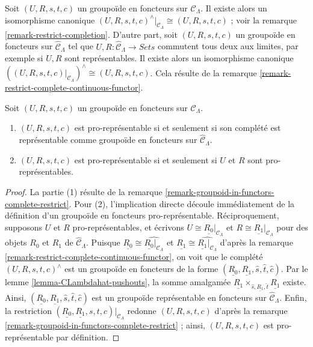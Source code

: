 \begin{remark}
\label{remark-groupoid-in-functors-complete-restrict}
Soit $(U, R, s, t, c)$ un groupoïde en foncteurs sur
$\mathcal{C}_\Lambda$. Il existe alors un isomorphisme canonique
$(U, R, s, t, c)^{\wedge}|_{\mathcal{C}_\Lambda} \cong (U, R, s, t, c)$ ; voir
la remarque \ref{remark-restrict-completion}. D'autre part, soit
$(U, R, s, t, c)$ un groupoïde en foncteurs sur
$\widehat{\mathcal{C}}_\Lambda$ tel que
$U, R : \widehat{\mathcal{C}}_\Lambda \to \textit{Sets}$
commutent tous deux aux limites, par exemple si $U, R$ sont représentables.
Il existe alors un isomorphisme canonique
$((U, R, s, t, c)|_{\mathcal{C}_\Lambda})^{\wedge} \cong (U, R, s, t, c)$.
Cela résulte de la remarque \ref{remark-restrict-complete-continuous-functor}.
\end{remark}

\begin{lemma}
\label{lemma-groupoid-in-functors-prorep-equivalences}
Soit $(U, R, s, t, c)$ un groupoïde en foncteurs sur
$\mathcal{C}_\Lambda$.
\begin{enumerate}
\item $(U, R, s, t, c)$ est pro-représentable si et seulement si son complété
est représentable comme groupoïde en foncteurs sur
$\widehat{\mathcal{C}}_\Lambda$.
\item $(U, R, s, t, c)$ est pro-représentable si et seulement si $U$ et $R$
sont pro-représentables.
\end{enumerate}
\end{lemma}

\begin{proof}
La partie (1) résulte de la remarque
\ref{remark-groupoid-in-functors-complete-restrict}. Pour (2), l'implication
directe découle immédiatement de la définition d'un groupoïde en foncteurs
pro-représentable. Réciproquement, supposons $U$ et $R$
pro-représentables, et écrivons $U \cong \underline{R_0}|_{\mathcal{C}_\Lambda}$ et
$R \cong \underline{R_1}|_{\mathcal{C}_\Lambda}$ pour des objets $R_0$ et
$R_1$ de $\widehat{\mathcal{C}}_\Lambda$. Puisque
$\underline{R_0} \cong \widehat{\underline{R_0}|_{\mathcal{C}_\Lambda}}$ et
$\underline{R_1} \cong \widehat{\underline{R_1}|_{\mathcal{C}_\Lambda}}$
d'après la remarque \ref{remark-restrict-complete-continuous-functor}, on voit
que le complété $(U, R, s, t, c)^\wedge$ est un groupoïde en foncteurs de la
forme
$(\underline{R_0}, \underline{R_1}, \widehat{s}, \widehat{t}, \widehat{c})$.
Par le lemme \ref{lemma-CLambdahat-pushouts}, la somme amalgamée
$\underline{R_1} \times_{\widehat{s}, \underline{R_1}, \widehat{t}}
\underline{R_1}$ existe. Ainsi,
$(\underline{R_0}, \underline{R_1}, \widehat{s}, \widehat{t}, \widehat{c})$
est un groupoïde représentable en foncteurs sur
$\widehat{\mathcal{C}}_\Lambda$. Enfin, la restriction
$(\underline{R_0}, \underline{R_1}, s, t, c)|_{\mathcal{C}_\Lambda}$
redonne $(U, R, s, t, c)$ d'après la remarque
\ref{remark-groupoid-in-functors-complete-restrict} ; ainsi,
$(U, R, s, t, c)$ est pro-représentable par définition.
\end{proof}






